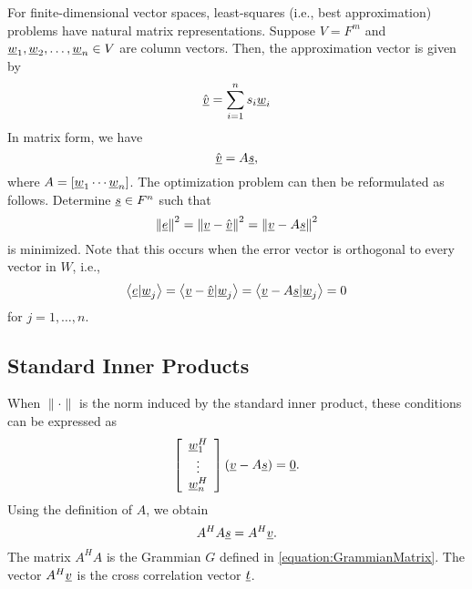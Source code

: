 For finite-dimensional vector spaces, least-squares (i.e., best approximation) problems have natural matrix representations.
Suppose $V = F^m$ and $\underline{w}_1, \underline{w}_2, \ldots, \underline{w}_n \in V$ are column vectors.
Then, the approximation vector is given by
\begin{equation*}
\hat{\underline{v}} = \sum_{i=1}^n s_i \underline{w}_i
\end{equation*}
In matrix form, we have
\begin{equation*}
\hat{\underline{v}} = A \underline{s},
\end{equation*}
where $A = \left[ \underline{w}_1 \cdots \underline{w}_n \right]$.
The optimization problem can then be reformulated as follows.
Determine $\underline{s} \in F^n$ such that
\begin{equation*}
\left\| \underline{e} \right\|^2
= \left\| \underline{v} - \hat{\underline{v}} \right\|^2
= \left\| \underline{v} - A \underline{s} \right\|^2
\end{equation*}
is minimized.
Note that this occurs when the error vector is orthogonal to every vector in $W$, i.e.,
\begin{equation*}
\left\langle \underline{e} | \underline{w}_j \right\rangle
= \left\langle \underline{v} - \hat{\underline{v}} | \underline{w}_j \right\rangle
= \left\langle \underline{v} - A \underline{s} | \underline{w}_j \right\rangle
= 0
\end{equation*}
for $j = 1, \ldots, n$.


\subsection{Standard Inner Products}

When $\| \cdot \|$ is the norm induced by the standard inner product, these conditions can be expressed as
\begin{equation*}
\left[ \begin{array}{c} \underline{w}_1^H \\ \vdots \\ \underline{w}_n^H \end{array} \right] \left( \underline{v} - A \underline{s} \right) = \underline{0} .
\end{equation*}
Using the definition of $A$, we obtain
\begin{equation*}
A^H A \underline{s} = A^H \underline{v} .
\end{equation*}
The matrix $A^H A$ is the Grammian $G$ defined in \eqref{equation:GrammianMatrix}.
The vector $A^H \underline{v}$ is the cross correlation vector $\underline{t}$.

